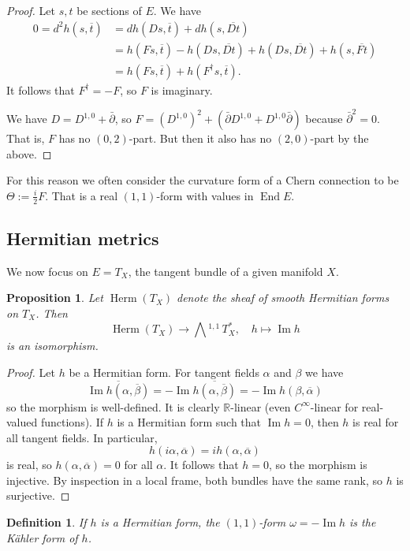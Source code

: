 \documentclass[10pt,a4paper]{article}
\newtheorem{prop}[theo]{Proposition}
\newtheorem{defi}[theo]{Definition}
\newtheorem*{proof}{Proof}
\newcommand{\kk}[1]{\mathbb{#1}}
\def\ov#1{\overline{#1}}
\DeclareMathOperator{\im}{Im}
\DeclareMathOperator{\End}{End}
\newcommand{\ext}[1]{\bigwedge{}^{\!\!#1}\,}
\begin{document}
\begin{proof}
Let $s, t$ be sections of $E$. We have
\begin{align*}
0
= d^2 h(s, \ov t)
&= d h(Ds, \ov t) + d h(s, \ov{Dt})
\\
&= h(F s, \ov t) - h(Ds, \ov{Dt}) + h(Ds, \ov{Dt}) + h(s, \ov{F t})
\\
&=
h(Fs,\ov t) + h(F^{\dagger}s, \ov{t}).
\end{align*}
It follows that $F^\dagger = -F$, so $F$ is imaginary.

We have $D = D^{1,0} + \bar\partial$, so $F = (D^{1,0})^2 + (\bar\partial D^{1,0} + D^{1,0}\bar\partial)$ because $\bar\partial^2 = 0$. That is, $F$ has no $(0,2)$-part. But then it also has no $(2,0)$-part by the above.
\end{proof}

For this reason we often consider the curvature form of a Chern connection to be $\Theta := \frac i2 F$. That is a real $(1,1)$-form with values in $\End E$.



\subsection{Hermitian metrics}

We now focus on $E = T_X$, the tangent bundle of a given manifold $X$.


\begin{prop}
Let $\operatorname{Herm}(T_X)$ denote the sheaf of smooth Hermitian forms on $T_X$. Then
$$
\operatorname{Herm}(T_X) \to \ext{1,1} T_X^*,
\quad
h \mapsto \im h
$$
is an isomorphism.
\end{prop}

\begin{proof}
Let $h$ be a Hermitian form. For tangent fields $\alpha$ and $\beta$ we have
$$
\overline{\im h(\alpha,\ov\beta)}
= -\im \overline{h(\alpha, \ov\beta)}
= -\im h(\beta, \ov\alpha)
$$
so the morphism is well-defined. It is clearly $\kk R$-linear (even $C^\infty$-linear for real-valued functions). If $h$ is a Hermitian form such that $\im h = 0$, then $h$ is real for all tangent fields. In particular,
$$
h(i\alpha, \ov\alpha) = i h(\alpha,\ov\alpha)
$$
is real, so $h(\alpha,\ov\alpha) = 0$ for all $\alpha$. It follows that $h = 0$, so the morphism is injective. By inspection in a local frame, both bundles have the same rank, so $h$ is surjective.
\end{proof}


\begin{defi}
If $h$ is a Hermitian form, the $(1,1)$-form $\omega = -\im h$ is the \emph{K\"ahler form} of $h$.
\end{defi}
\end{document}
